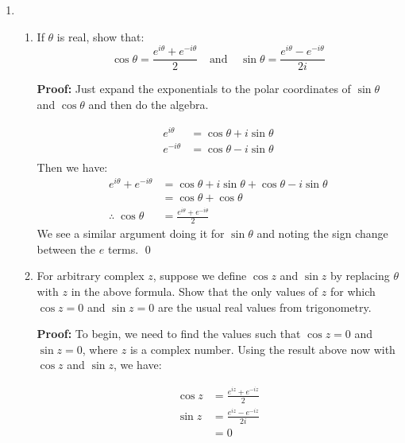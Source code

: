 \begin{enumerate}
	\item
	      \begin{enumerate}

		      \item If $\theta$ is real, show that:
		            \[\cos{\theta} = \frac{e^{i\theta} + e^{-i\theta}}{2} \;\;\;\ \text{and} \;\;\;\; \sin{\theta}
			            = {\frac{e^{i\theta} - e^{-i\theta}}{2i}}\]

		            \textbf{Proof:}
		            Just expand the exponentials to the polar coordinates of $\sin\theta$ and $\cos\theta$ and
		            then do the algebra.

		            \begin{align*}
			            e^{i\theta}  & = \cos\theta + i\sin\theta \\
			            e^{-i\theta} & = \cos\theta - i\sin\theta \\
		            \end{align*}
		            Then we have:
		            \begin{align*}
			            e^{i\theta} + e^{-i\theta} & = \cos\theta + i\sin\theta + \cos\theta - i\sin\theta \\
			                                       & = \cos\theta + \cos\theta                             \\
			            \therefore \; \cos\theta   & =  \frac{e^{i\theta} + e^{-i\theta}}{2}
		            \end{align*}
		            We see a similar argument doing it for $\sin\theta$ and noting the sign change between the $e$ terms.
		            \qed

		      \item For arbitrary complex $z$, suppose we define $\cos{z}$ and $\sin{z}$ by replacing $\theta$ with $z$ in
		            the above formula. Show that the only values of $z$ for which $\cos{z} = 0$ and $\sin{z} = 0$
		            are the usual real values from trigonometry.

		            \textbf{Proof:}
		            To begin, we need to find the values such that $\cos{z}=0$ and $\sin{z}=0$, where $z$ is a
		            complex number. Using the result above now with $\cos{z}$ and $\sin{z}$, we have:

		            \begin{align*}
			            \cos{z} & = \frac{e^{iz} + e^{-iz}}{2}  \\
			            \sin{z} & = \frac{e^{iz} - e^{-iz}}{2i} \\
			                    & = 0
		            \end{align*}


\end{enumerate}
\end{enumerate}
